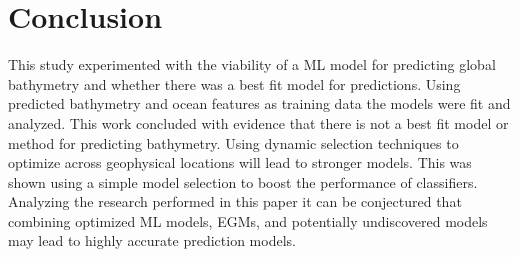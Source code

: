 \section{Conclusion}
\setlength{\parindent}{10ex}
This study experimented with the viability of a \ac{ML} model for predicting global bathymetry and whether there was a best fit model for predictions.
Using predicted bathymetry and ocean features as training data the models were fit and analyzed.
This work concluded with evidence that there is not a best fit model or method for predicting bathymetry.
Using dynamic selection techniques to optimize across geophysical locations will lead to stronger models.
This was shown using a simple model selection to boost the performance of classifiers.
Analyzing the research performed in this paper it can be conjectured that combining optimized \ac{ML} models, \ac{EGM}s, and potentially undiscovered models may lead to highly accurate prediction models.